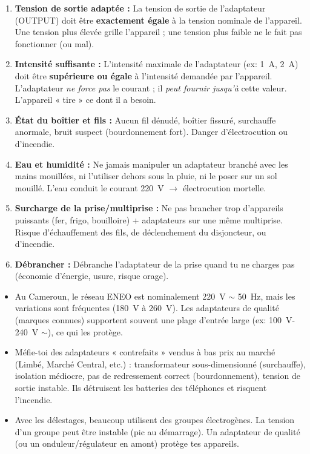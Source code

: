 \documentclass[11pt]{article}
\newcounter{popsec}
\newcounter{popsub}
\newcommand{\courssub}[1]{%
  \stepcounter{popsub}%
  \par\vspace{9pt}\noindent{\popxbold\fontsize{11.5}{13}\selectfont\color{popink}{\color{poporange}\thepopsec.\thepopsub}\hspace{6pt}#1}\par\nopagebreak\vspace{4pt}
}
\begin{document}
\courssub{Sécurité et bon usage des adaptateurs}

\begin{attention}
\begin{enumerate}
\item \textbf{Tension de sortie adaptée :} La tension de sortie de l'adaptateur (OUTPUT) doit être \textbf{exactement égale} à la tension nominale de l'appareil. Une tension plus élevée grille l'appareil ; une tension plus faible ne le fait pas fonctionner (ou mal).
\item \textbf{Intensité suffisante :} L'intensité maximale de l'adaptateur (ex: \SI{1}{A}, \SI{2}{A}) doit être \textbf{supérieure ou égale} à l'intensité demandée par l'appareil. L'adaptateur \emph{ne force pas} le courant ; il \emph{peut fournir jusqu'à} cette valeur. L'appareil « tire » ce dont il a besoin.
\item \textbf{État du boîtier et fils :} Aucun fil dénudé, boîtier fissuré, surchauffe anormale, bruit suspect (bourdonnement fort). Danger d'électrocution ou d'incendie.
\item \textbf{Eau et humidité :} Ne jamais manipuler un adaptateur branché avec les mains mouillées, ni l'utiliser dehors sous la pluie, ni le poser sur un sol mouillé. L'eau conduit le courant \SI{220}{V} $\rightarrow$ électrocution mortelle.
\item \textbf{Surcharge de la prise/multiprise :} Ne pas brancher trop d'appareils puissants (fer, frigo, bouilloire) + adaptateurs sur une même multiprise. Risque d'échauffement des fils, de déclenchement du disjoncteur, ou d'incendie.
\item \textbf{Débrancher :} Débranche l'adaptateur de la prise quand tu ne charges pas (économie d'énergie, usure, risque orage).
\end{enumerate}
\end{attention}

\begin{savaistu}
\begin{itemize}
\item Au Cameroun, le réseau ENEO est nominalement \SI{220}{V} $\sim$ \SI{50}{Hz}, mais les variations sont fréquentes (\SI{180}{V} à \SI{260}{V}). Les adaptateurs de qualité (marques connues) supportent souvent une plage d'entrée large (ex: \SI{100}{V}-\SI{240}{V} $\sim$), ce qui les protège.
\item Méfie-toi des adaptateurs « contrefaits » vendus à bas prix au marché (Limbé, Marché Central, etc.) : transformateur sous-dimensionné (surchauffe), isolation médiocre, pas de redressement correct (bourdonnement), tension de sortie instable. Ils détruisent les batteries des téléphones et risquent l'incendie.
\item Avec les délestages, beaucoup utilisent des groupes électrogènes. La tension d'un groupe peut être instable (pic au démarrage). Un adaptateur de qualité (ou un onduleur/régulateur en amont) protège tes appareils.
\end{itemize}
\end{savaistu}
\end{document}
